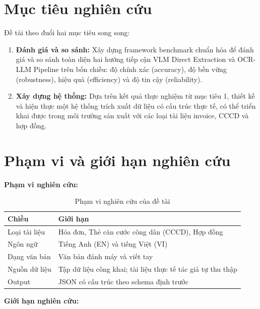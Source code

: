 ﻿\documentclass[12pt]{report}
\begin{document}
\section{Mục tiêu nghiên cứu}\label{sec:muctieu}

Đề tài theo đuổi hai mục tiêu song song:

\begin{enumerate}
    \item \textbf{Đánh giá và so sánh:} Xây dựng framework benchmark chuẩn hóa để đánh giá và so sánh toàn diện hai hướng tiếp cận VLM Direct Extraction và OCR-LLM Pipeline trên bốn chiều: độ chính xác (accuracy), độ bền vững (robustness), hiệu quả (efficiency) và độ tin cậy (reliability).

    \item \textbf{Xây dựng hệ thống:} Dựa trên kết quả thực nghiệm từ mục tiêu 1, thiết kế và hiện thực một hệ thống trích xuất dữ liệu có cấu trúc thực tế, có thể triển khai được trong môi trường sản xuất với các loại tài liệu invoice, CCCD và hợp đồng.
\end{enumerate}

\section{Phạm vi và giới hạn nghiên cứu}\label{sec:phamvi}

\noindent\textbf{Phạm vi nghiên cứu:}

\begin{table}[h]
\centering
\caption{Phạm vi nghiên cứu của đề tài}
\label{tab:phamvi}
\begin{tabular}{|l|p{9cm}|}
\hline
\textbf{Chiều} & \textbf{Giới hạn} \\ \hline
Loại tài liệu & Hóa đơn, Thẻ căn cước công dân (CCCD), Hợp đồng \\ \hline
Ngôn ngữ & Tiếng Anh (EN) và tiếng Việt (VI) \\ \hline
Dạng văn bản & Văn bản đánh máy và viết tay \\ \hline
Nguồn dữ liệu & Tập dữ liệu công khai; tài liệu thực tế tác giả tự thu thập \\ \hline
Output & JSON có cấu trúc theo schema định trước \\ \hline
\end{tabular}
\end{table}

\bigskip

\noindent\textbf{Giới hạn nghiên cứu:}
\end{document}
